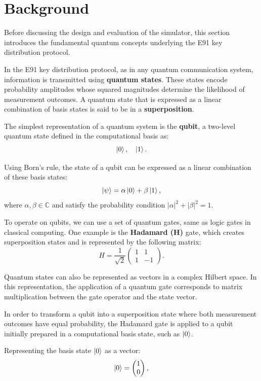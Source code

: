 \section{Background}\label{s:background}

Before discussing the design and evaluation of the simulator, this section introduces the fundamental quantum concepts underlying the E91 key distribution protocol.

In the E91 key distribution protocol, as in any quantum communication system, information is transmitted using \textbf{quantum states}. These states encode probability amplitudes whose squared magnitudes determine the likelihood of measurement outcomes. A quantum state that is expressed as a linear combination of basis states is said to be in a \textbf{superposition}.

The simplest representation of a quantum system is the \textbf{qubit}, a two-level quantum state defined in the computational basis as:
\[
\ket{0}, \quad \ket{1}.
\]

Using Born’s rule, the state of a qubit can be expressed as a linear combination of these basis states:
\[
\ket{\psi} = \alpha\ket{0} + \beta\ket{1},
\]
where $\alpha, \beta \in \mathbb{C}$ and satisfy the probability condition $|\alpha|^2 + |\beta|^2 = 1$.

To operate on qubits, we can use a set of quantum gates, same as  logic gates in classical computing. One example is the \textbf{Hadamard (H)} gate, which creates superposition states and is represented by the following matrix:
\[
H = \frac{1}{\sqrt{2}}
\begin{pmatrix}
1 & 1 \\
1 & -1
\end{pmatrix}.
\]

Quantum states can also be represented as vectors in a complex Hilbert space. In this representation, the application of a quantum gate corresponds to matrix multiplication between the gate operator and the state vector.

In order to transform a qubit into a superposition state where both measurement outcomes have equal probability, the Hadamard gate is applied to a qubit initially prepared in a computational basis state, such as $\ket{0}$.

Representing the basis state $\ket{0}$ as a vector:
\[
\ket{0} =
\begin{pmatrix}
1 \\
0
\end{pmatrix},
\]

